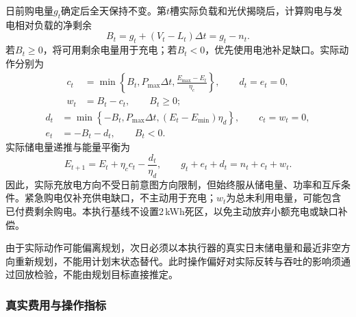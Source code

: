 日前购电量$g_t$确定后全天保持不变。第$t$槽实际负载和光伏揭晓后，计算购电与发电相对负载的净剩余
\begin{equation}\label{eq:q2-surplus}
 B_t=g_t+(V_t-L_t)\Delta t=g_t-n_t.
\end{equation}
若$B_t\ge0$，将可用剩余电量用于充电；若$B_t<0$，优先使用电池补足缺口。实际动作分别为
\begin{equation}\label{eq:q2-charge-execute}
 \begin{aligned}
 c_t&=\min\left\{B_t,P_{\max}\Delta t,
 \frac{E_{\max}-E_t}{\eta_c}\right\},\qquad d_t=e_t=0,\\
 w_t&=B_t-c_t,\qquad B_t\ge0;
 \end{aligned}
\end{equation}
\begin{equation}\label{eq:q2-discharge-execute}
 \begin{aligned}
 d_t&=\min\left\{-B_t,P_{\max}\Delta t,
 (E_t-E_{\min})\eta_d\right\},\qquad c_t=w_t=0,\\
 e_t&=-B_t-d_t,\qquad B_t<0.
 \end{aligned}
\end{equation}
实际储电量递推与能量平衡为
\begin{equation}\label{eq:q2-actual-balance}
 E_{t+1}=E_t+\eta_c c_t-\frac{d_t}{\eta_d},\qquad
 g_t+e_t+d_t=n_t+c_t+w_t.
\end{equation}
因此，实际充放电方向不受日前意图方向限制，但始终服从储电量、功率和互斥条件。紧急购电仅补充供电缺口，不主动用于充电；$w_t$为总未利用电量，可能包含已付费剩余购电。本执行基线不设置2\,kWh死区，以免主动放弃小额充电或缺口补偿。

由于实际动作可能偏离规划，次日必须以本执行器的真实日末储电量和最近非空方向重新规划，不能用计划末状态替代。此时操作偏好对实际反转与吞吐的影响须通过回放检验，不能由规划目标直接推定。

\subsubsection{真实费用与操作指标}

